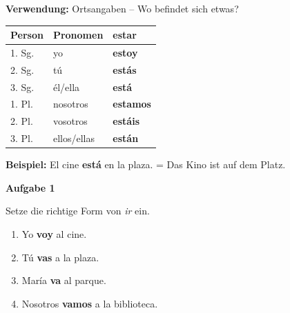 \documentclass[11pt, a4paper]{article}
\newcommand{\fachfarbe}{spanisch}
\newcommand{\punktebox}[1]{\hfill\fbox{\small \_/#1}}
\newcommand{\loesung}[1]{\textcolor{loesung}{\textbf{#1}}}
\newcommand{\es}[1]{\textcolor{\fachfarbe}{\textbf{#1}}}
\newenvironment{aufgabe}[1]{%
    \vspace{10pt}
    \noindent\textbf{\textcolor{\fachfarbe}{Aufgabe #1}}
    \vspace{5pt}
    \begin{list}{}{\leftmargin=0pt}
    \item[]
}{%
    \end{list}
}
\begin{document}

\begin{merkkasten}

\textbf{Verwendung:} Ortsangaben -- Wo befindet sich etwas?

\begin{center}
\begin{tabular}{|l|l|l|}
\hline
\textbf{Person} & \textbf{Pronomen} & \textbf{estar} \\
\hline
1. Sg. & yo & \loesung{estoy} \\
\hline
2. Sg. & tú & \loesung{estás} \\
\hline
3. Sg. & él/ella & \loesung{está} \\
\hline
1. Pl. & nosotros & \loesung{estamos} \\
\hline
2. Pl. & vosotros & \loesung{estáis} \\
\hline
3. Pl. & ellos/ellas & \loesung{están} \\
\hline
\end{tabular}
\end{center}

\vspace{0.5em}
\textbf{Beispiel:} El cine \es{está} en la plaza. = Das Kino ist auf dem Platz.
\end{merkkasten}

\vspace{15pt}


\begin{aufgabe}{1}
Setze die richtige Form von \textit{ir} ein. \punktebox{4}
\end{aufgabe}

\begin{enumerate}[label=\alph*)]
    \item Yo \loesung{voy} al cine.
    \item Tú \loesung{vas} a la plaza.
    \item María \loesung{va} al parque.
    \item Nosotros \loesung{vamos} a la biblioteca.
\end{enumerate}
\end{document}

